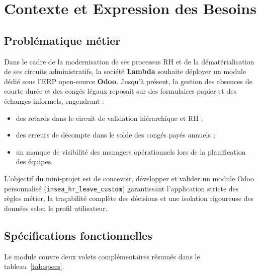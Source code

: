 \documentclass[11pt,a4paper]{article}
\begin{document}
\tableofcontents
\newpage

\section{Contexte et Expression des Besoins}

\subsection{Problématique métier}
Dans le cadre de la modernisation de ses processus RH et de la dématérialisation de ses circuits administratifs, la société \textbf{Lambda} souhaite déployer un module dédié sous l'ERP open-source \textbf{Odoo}. Jusqu'à présent, la gestion des absences de courte durée et des congés légaux reposait sur des formulaires papier et des échanges informels, engendrant :
\begin{itemize}[itemsep=2pt]
    \item des retards dans le circuit de validation hiérarchique et RH ;
    \item des erreurs de décompte dans le solde des congés payés annuels ;
    \item un manque de visibilité des managers opérationnels lors de la planification des équipes.
\end{itemize}

L'objectif du mini-projet est de concevoir, développer et valider un module Odoo personnalisé (\texttt{insea\_hr\_leave\_custom}) garantissant l'application stricte des règles métier, la traçabilité complète des décisions et une isolation rigoureuse des données selon le profil utilisateur.

\subsection{Spécifications fonctionnelles}
Le module couvre deux volets complémentaires résumés dans le tableau~\ref{tab:specs}.
\end{document}
